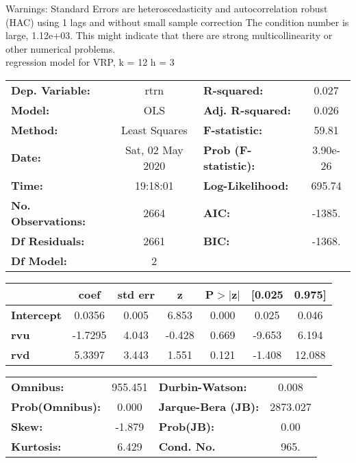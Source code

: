 Warnings: \newline
 [1] Standard Errors are heteroscedasticity and autocorrelation robust (HAC) using 1 lags and without small sample correction \newline
 [2] The condition number is large, 1.12e+03. This might indicate that there are \newline
 strong multicollinearity or other numerical problems.\\ 

regression model for VRP, k = 12 h = 3\begin{center}
\begin{tabular}{lclc}
\toprule
\textbf{Dep. Variable:}    &       rtrn       & \textbf{  R-squared:         } &     0.027   \\
\textbf{Model:}            &       OLS        & \textbf{  Adj. R-squared:    } &     0.026   \\
\textbf{Method:}           &  Least Squares   & \textbf{  F-statistic:       } &     59.81   \\
\textbf{Date:}             & Sat, 02 May 2020 & \textbf{  Prob (F-statistic):} &  3.90e-26   \\
\textbf{Time:}             &     19:18:01     & \textbf{  Log-Likelihood:    } &    695.74   \\
\textbf{No. Observations:} &        2664      & \textbf{  AIC:               } &    -1385.   \\
\textbf{Df Residuals:}     &        2661      & \textbf{  BIC:               } &    -1368.   \\
\textbf{Df Model:}         &           2      & \textbf{                     } &             \\
\bottomrule
\end{tabular}
\begin{tabular}{lcccccc}
                   & \textbf{coef} & \textbf{std err} & \textbf{z} & \textbf{P$> |$z$|$} & \textbf{[0.025} & \textbf{0.975]}  \\
\midrule
\textbf{Intercept} &       0.0356  &        0.005     &     6.853  &         0.000        &        0.025    &        0.046     \\
\textbf{rvu}       &      -1.7295  &        4.043     &    -0.428  &         0.669        &       -9.653    &        6.194     \\
\textbf{rvd}       &       5.3397  &        3.443     &     1.551  &         0.121        &       -1.408    &       12.088     \\
\bottomrule
\end{tabular}
\begin{tabular}{lclc}
\textbf{Omnibus:}       & 955.451 & \textbf{  Durbin-Watson:     } &    0.008  \\
\textbf{Prob(Omnibus):} &   0.000 & \textbf{  Jarque-Bera (JB):  } & 2873.027  \\
\textbf{Skew:}          &  -1.879 & \textbf{  Prob(JB):          } &     0.00  \\
\textbf{Kurtosis:}      &   6.429 & \textbf{  Cond. No.          } &     965.  \\
\bottomrule
\end{tabular}
\end{center}

